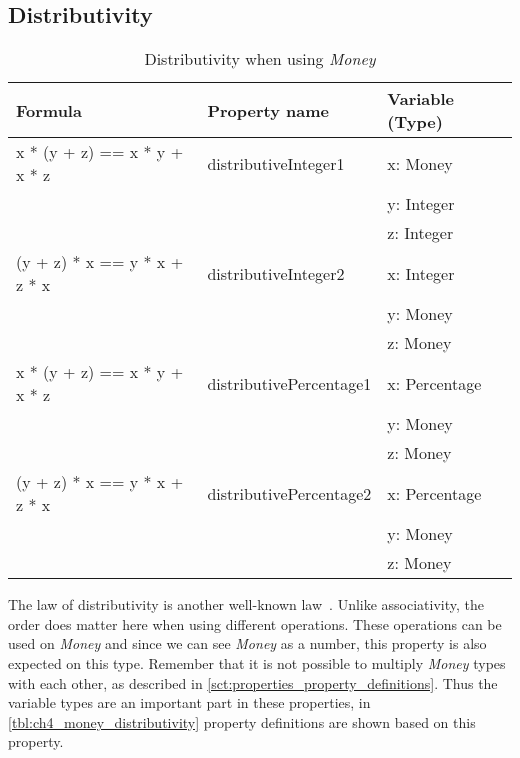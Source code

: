 \subsection*{Distributivity}
\FloatBarrier
\begin{table}[!ht]
\centering
\begin{tabular}{lll}
\hline
                        \textbf{Formula}             & \textbf{Property name}  & \textbf{Variable (Type)} \\ \hline
\rowcolor[HTML]{EFEFEF} x * (y + z) == x * y + x * z & distributiveInteger1    & x: Money                 \\
\rowcolor[HTML]{EFEFEF}                              &                         & y: Integer               \\
\rowcolor[HTML]{EFEFEF}                              &                         & z: Integer               \\
                        (y + z) * x == y * x + z * x & distributiveInteger2    & x: Integer               \\
                                                     &                         & y: Money                 \\
                                                     &                         & z: Money                 \\
\rowcolor[HTML]{EFEFEF} x * (y + z) == x * y + x * z & distributivePercentage1 & x: Percentage            \\
\rowcolor[HTML]{EFEFEF}                              &                         & y: Money                 \\
\rowcolor[HTML]{EFEFEF}                              &                         & z: Money                 \\
                        (y + z) * x == y * x + z * x & distributivePercentage2 & x: Percentage            \\
                                                     &                         & y: Money                 \\
                                                     &                         & z: Money                 \\ \hline
\end{tabular}
\caption{Distributivity when using \textit{Money}}
\label{tbl:ch4_money_distributivity}
\end{table}
\FloatBarrier
The law of distributivity is another well-known law~\cite{baumgart1961axioms}. Unlike associativity, the order does matter here when using different operations. These operations can be used on \textit{Money} and since we can see \textit{Money} as a number, this property is also expected on this type. Remember that it is not possible to multiply \textit{Money} types with each other, as described in \autoref{sct:properties_property_definitions}. Thus the variable types are an important part in these properties, in \autoref{tbl:ch4_money_distributivity} property definitions are shown based on this property.

